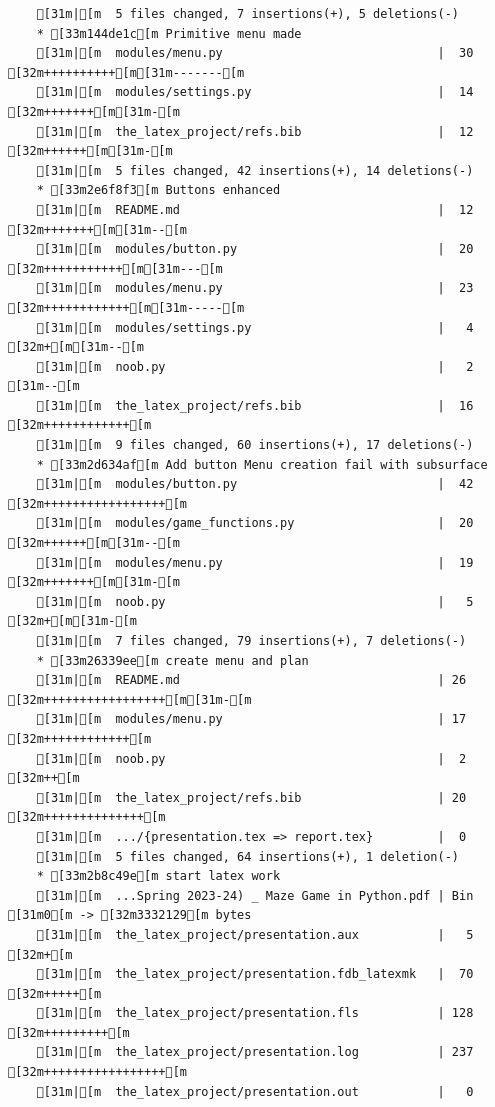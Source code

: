 \documentclass{article}
\begin{document}
{\begin{verbatim}
    [31m|[m  5 files changed, 7 insertions(+), 5 deletions(-)
    * [33m144de1c[m Primitive menu made
    [31m|[m  modules/menu.py                              |  30 [32m++++++++++[m[31m-------[m
    [31m|[m  modules/settings.py                          |  14 [32m+++++++[m[31m-[m
    [31m|[m  the_latex_project/refs.bib                   |  12 [32m++++++[m[31m-[m
    [31m|[m  5 files changed, 42 insertions(+), 14 deletions(-)
    * [33m2e6f8f3[m Buttons enhanced
    [31m|[m  README.md                                    |  12 [32m+++++++[m[31m--[m
    [31m|[m  modules/button.py                            |  20 [32m+++++++++++[m[31m---[m
    [31m|[m  modules/menu.py                              |  23 [32m++++++++++++[m[31m-----[m
    [31m|[m  modules/settings.py                          |   4 [32m+[m[31m--[m
    [31m|[m  noob.py                                      |   2 [31m--[m
    [31m|[m  the_latex_project/refs.bib                   |  16 [32m++++++++++++[m
    [31m|[m  9 files changed, 60 insertions(+), 17 deletions(-)
    * [33m2d634af[m Add button Menu creation fail with subsurface
    [31m|[m  modules/button.py                            |  42 [32m+++++++++++++++++[m
    [31m|[m  modules/game_functions.py                    |  20 [32m++++++[m[31m--[m
    [31m|[m  modules/menu.py                              |  19 [32m+++++++[m[31m-[m
    [31m|[m  noob.py                                      |   5 [32m+[m[31m-[m
    [31m|[m  7 files changed, 79 insertions(+), 7 deletions(-)
    * [33m26339ee[m create menu and plan
    [31m|[m  README.md                                    | 26 [32m+++++++++++++++++[m[31m-[m
    [31m|[m  modules/menu.py                              | 17 [32m++++++++++++[m
    [31m|[m  noob.py                                      |  2 [32m++[m
    [31m|[m  the_latex_project/refs.bib                   | 20 [32m++++++++++++++[m
    [31m|[m  .../{presentation.tex => report.tex}         |  0
    [31m|[m  5 files changed, 64 insertions(+), 1 deletion(-)
    * [33m2b8c49e[m start latex work
    [31m|[m  ...Spring 2023-24) _ Maze Game in Python.pdf | Bin [31m0[m -> [32m3332129[m bytes
    [31m|[m  the_latex_project/presentation.aux           |   5 [32m+[m
    [31m|[m  the_latex_project/presentation.fdb_latexmk   |  70 [32m+++++[m
    [31m|[m  the_latex_project/presentation.fls           | 128 [32m+++++++++[m
    [31m|[m  the_latex_project/presentation.log           | 237 [32m+++++++++++++++++[m
    [31m|[m  the_latex_project/presentation.out           |   0

\end{verbatim}}
\end{document}
